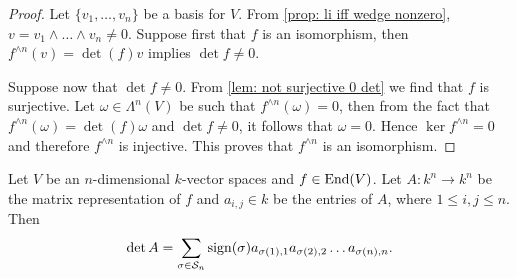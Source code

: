 \begin{proof}
  Let \(\{v_1, \dots, v_n\}\) be a basis for \(V\). From \cref{prop: li iff
  wedge nonzero}, \(v = v_1 \wedge \dots \wedge v_n \neq 0\).  Suppose first
  that \(f\) is an isomorphism, then \(f^{\wedge n}(v) = \det(f) v\) implies
  \(\det f \neq 0\).

  Suppose now that \(\det f \neq 0\). From \cref{lem: not surjective 0 det} we
  find that \(f\) is surjective. Let \(\omega \in \Lambda^n(V)\) be such that
  \(f^{\wedge n}(\omega) = 0\), then from the fact that \(f^{\wedge n}(\omega) =
  \det(f) \omega\) and \(\det f \neq 0\), it follows that \(\omega = 0\). Hence
  \(\ker f^{\wedge n} = 0\) and therefore \(f^{\wedge n}\) is injective. This
  proves that \(f^{\wedge n}\) is an isomorphism.
\end{proof}

\begin{proposition}
  \label{prop: matrix det}
  Let \(V\) be an \(n\)-dimensional \(k\)-vector spaces and \(f \in \operatorname{End}(V)\).
  Let \(A: k^n \to k^n\) be the matrix representation of \(f\) and \(a_{i, j}
  \in k\) be the entries of \(A\), where \(1 \leq i, j \leq n\). Then
  \[
    \det A = \sum_{\sigma \in \mathcal S_n} \operatorname{sign}(\sigma) a_{\sigma(1), 1}
    a_{\sigma(2), 2} \dots a_{\sigma(n), n}.
  \]
\end{proposition}

